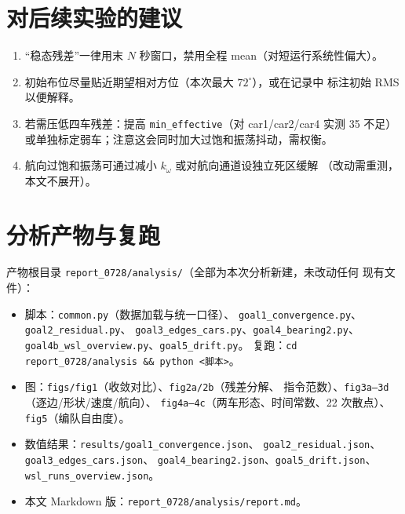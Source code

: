 \documentclass[11pt,a4paper]{ctexart}
\newcommand{\file}[1]{\texttt{#1}}
\newcommand{\degC}{^\circ}
\begin{document}
\section{对后续实验的建议}

\begin{enumerate}
  \item “稳态残差”一律用末 $N$ 秒窗口，禁用全程 mean（对短运行系统性偏大）。
  \item 初始布位尽量贴近期望相对方位（本次最大 $72\degC$），或在记录中
        标注初始 RMS 以便解释。
  \item 若需压低四车残差：提高 \texttt{min\_effective}（对 car1/car2/car4
        实测 35 不足）或单独标定弱车；注意这会同时加大过饱和振荡抖动，需权衡。
  \item 航向过饱和振荡可通过减小 $k_\omega$ 或对航向通道设独立死区缓解
        （改动需重测，本文不展开）。
\end{enumerate}

\appendix
\section{分析产物与复跑}

产物根目录 \file{report\_0728/analysis/}（全部为本次分析新建，未改动任何
现有文件）：

\begin{itemize}
  \item 脚本：\file{common.py}（数据加载与统一口径）、
        \file{goal1\_convergence.py}、\file{goal2\_residual.py}、
        \file{goal3\_edges\_cars.py}、\file{goal4\_bearing2.py}、
        \file{goal4b\_wsl\_overview.py}、\file{goal5\_drift.py}。
        复跑：\texttt{cd report\_0728/analysis \&\& python <脚本>}。
  \item 图：\file{figs/fig1}（收敛对比）、\file{fig2a/2b}（残差分解、
        指令范数）、\file{fig3a--3d}（逐边/形状/速度/航向）、
        \file{fig4a--4c}（两车形态、时间常数、22 次散点）、
        \file{fig5}（编队自由度）。
  \item 数值结果：\file{results/goal1\_convergence.json}、
        \file{goal2\_residual.json}、\file{goal3\_edges\_cars.json}、
        \file{goal4\_bearing2.json}、\file{goal5\_drift.json}、
        \file{wsl\_runs\_overview.json}。
  \item 本文 Markdown 版：\file{report\_0728/analysis/report.md}。
\end{itemize}
\end{document}
